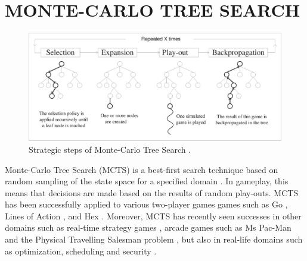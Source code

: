 \documentclass{ecai2014}
\begin{document}
\section{MONTE-CARLO TREE SEARCH}
\label{sec:mcts}
\begin{figure}[ht]
	\centering
	\includegraphics[width=.45\textwidth]{img/figure1.eps}
	\caption{Strategic steps of Monte-Carlo Tree Search \cite{chaslot2008progressive}.}
	\label{fig:mcts-algorithm}
\end{figure}
Monte-Carlo Tree Search (MCTS) is a best-first search technique based on random sampling of the state space for a specified domain \cite{coulom2007efficient,kocsis2006bandit}. In gameplay, this means that decisions are made based on the results of random play-outs. MCTS has been successfully applied to various two-player games games such as Go \cite{lee2010current}, Lines of Action \cite{Winands2010b}, and Hex \cite{arneson2010monte}. Moreover, MCTS has recently seen successes in other domains such as real-time strategy games \cite{browne2012survey}, arcade games such as Ms Pac-Man \cite{enhancementspacmancig12} and the Physical Travelling Salesman problem \cite{powleytsp}, but also in real-life domains such as optimization, scheduling and security \cite{browne2012survey}.
\end{document}
